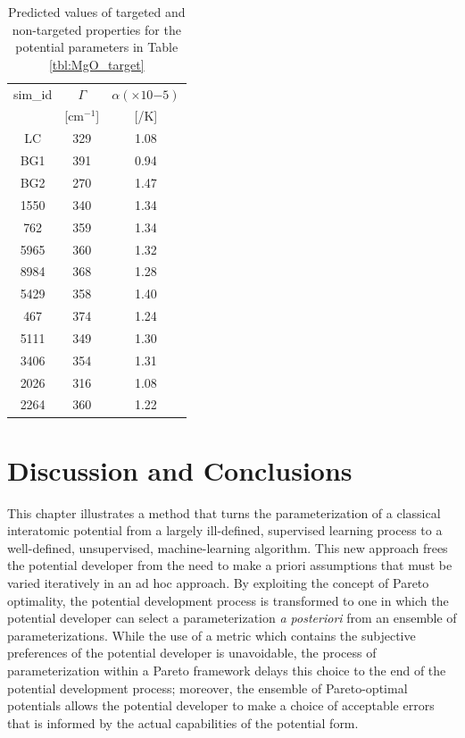 \begin{table}
	\caption{Predicted values of targeted and non-targeted properties for the potential parameters in Table \ref{tbl:MgO_target}}
	\label{tbl:MgO_best_testing_qoi}	\centering
		\begin{tabular}{ccc}
			\hline
		  sim\_id &$\Gamma$ & $\alpha(\times 10{-5})$ \\
			        & [$\text{cm}^{-1}$] & [/K] \\
		  \hline
			LC   & 329  & 1.08 \\
			BG1  & 391	& 0.94 \\
			BG2  & 270  & 1.47 \\
			1550 & 340	& 1.34 \\
			762  & 359  & 1.34 \\
			5965 & 360  & 1.32 \\
			8984 & 368  & 1.28 \\
			5429 & 358	& 1.40 \\
			467  & 374	& 1.24 \\
			5111 & 349  & 1.30 \\
			3406 & 354	& 1.31 \\
			2026 & 316  & 1.08 \\
			2264 & 360  & 1.22 \\
			\hline
		\end{tabular}
\end{table}

\section{Discussion and Conclusions}
This chapter illustrates a method that turns the parameterization of a classical interatomic potential from a largely ill-defined, supervised learning process to a well-defined, unsupervised, machine-learning algorithm.  This new approach frees the potential developer from the need to make a priori assumptions that must be varied iteratively in an ad hoc approach.  By exploiting the concept of Pareto optimality, the potential development process is transformed to one in which the potential developer can select a parameterization \emph{a posteriori} from an ensemble of parameterizations. While the use of a metric which contains the subjective preferences of the potential developer is unavoidable, the process of parameterization within a Pareto framework delays this choice to the end of the potential development process; moreover, the ensemble of Pareto-optimal potentials allows the potential developer to make a choice of acceptable errors that is informed by the actual capabilities of the potential form.

